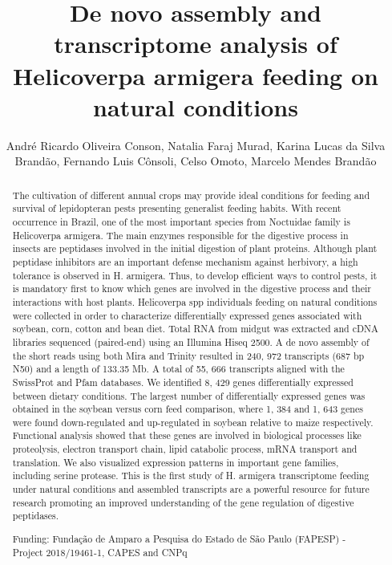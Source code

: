 \documentclass[twoside]{article}
\title{\vspace{-15mm}\fontsize{24pt}{10pt}\selectfont\textbf{ De novo assembly and transcriptome analysis of Helicoverpa armigera feeding on natural conditions }} %
\author{ Andr\'e Ricardo Oliveira Conson, Natalia Faraj Murad, Karina Lucas da Silva Brand\~ao, Fernando Luis C\^onsoli, Celso Omoto, Marcelo Mendes Brand\~ao }
\affil{ Unicamp }
\date{}
\begin{document}
  
  
  \maketitle %
  
  
  \thispagestyle{fancy} %
  
  
  \begin{abstract}
  The cultivation of different annual crops may provide ideal conditions for feeding and survival of lepidopteran pests presenting generalist feeding habits. With recent occurrence in Brazil,  one of the most important species from Noctuidae family is Helicoverpa armigera. The main enzymes responsible for the digestive process in insects are peptidases involved in the initial digestion of plant proteins. Although plant peptidase inhibitors are an important defense mechanism against herbivory,  a high tolerance is observed in H. armigera. Thus,  to develop efficient ways to control pests,  it is mandatory first to know which genes are involved in the digestive process and their interactions with host plants. Helicoverpa spp individuals feeding on natural conditions were collected in order to characterize differentially expressed genes associated with soybean,  corn,  cotton and bean diet. Total RNA from midgut was extracted and cDNA libraries sequenced (paired-end) using an Illumina Hiseq 2500. A de novo assembly of the short reads using both Mira and Trinity resulted in 240, 972 transcripts (687 bp N50) and a length of 133.35 Mb. A total of 55, 666 transcripts aligned with the SwissProt and Pfam databases. We identified 8, 429 genes differentially expressed between dietary conditions. The largest number of differentially expressed genes was obtained in the soybean versus corn feed comparison,  where 1, 384 and 1, 643 genes were found down-regulated and up-regulated in soybean relative to maize respectively. Functional analysis showed that these genes are involved in biological processes like proteolysis,  electron transport chain,  lipid catabolic process,  mRNA transport and translation. We also visualized expression patterns in important gene families,  including serine protease. This is the first study of H. armigera transcriptome feeding under natural conditions and assembled transcripts are a powerful resource for future research promoting an improved understanding of the gene regulation of digestive peptidases.
  
  Funding: Funda\c{c}\~ao de Amparo a Pesquisa do Estado de S\~ao Paulo (FAPESP) - Project 2018/19461-1,  CAPES and CNPq \\ 
  \end{abstract}
  
\end{document}
